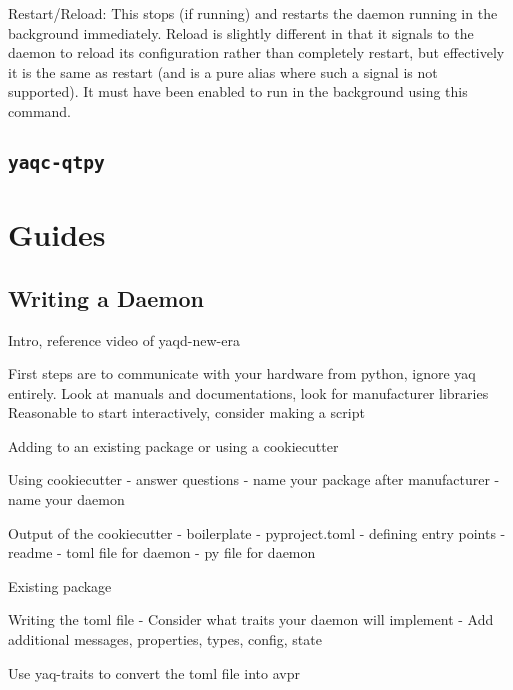 Restart/Reload: This stops (if running) and restarts the daemon running
in the background immediately. Reload is slightly different in that it
signals to the daemon to reload its configuration rather than completely
restart, but effectively it is the same as restart (and is a pure alias
where such a signal is not supported). It must have been enabled to run
in the background using this command.




\subsection{\texttt{yaqc-qtpy}}

\clearpage

\section{Guides}

\subsection{Writing a Daemon}

Intro, reference video of yaqd-new-era

First steps are to communicate with your hardware from python, ignore yaq entirely.
Look at manuals and documentations, look for manufacturer libraries
Reasonable to start interactively, consider making a script

Adding to an existing package or using a cookiecutter

Using cookiecutter
- answer questions
- name your package after manufacturer
- name your daemon

Output of the cookiecutter
- boilerplate
- pyproject.toml
	- defining entry points
- readme
- toml file for daemon
- py file for daemon

Existing package

Writing the toml file
- Consider what traits your daemon will implement
- Add additional messages, properties, types, config, state

Use yaq-traits to convert the toml file into avpr

